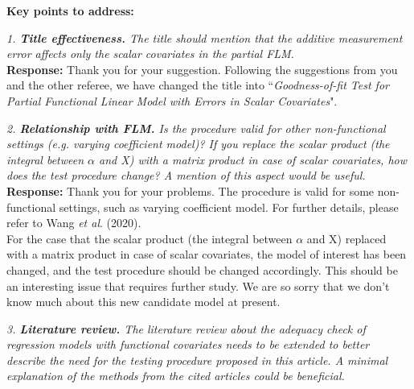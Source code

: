 \documentclass[12pt]{report}
\begin{document}
\vspace*{0.1in}

{\bf Key points to address:}

\vspace*{0.1in}


\begin{description}


\item {{ \textcolor[rgb]{0.00,0.50,1.00}{\em 1. {\bf {Title effectiveness.}} The title should mention that the additive measurement error affects
only the scalar covariates in the partial FLM. }}} \\

{ \bf Response: } Thank you for your suggestion. Following the suggestions from you and the other referee, we have changed the title into ``\emph{Goodness-of-fit Test for Partial Functional Linear Model with Errors in Scalar Covariates}".\\


\item {{ \textcolor[rgb]{0.00,0.50,1.00}{\em 2. {\bf Relationship with FLM.} Is the procedure valid for other non-functional settings (e.g.
varying coefficient model)? If you replace the scalar product (the integral between $\alpha$ and X)
with a matrix product in case of scalar covariates, how does the test procedure change? A
mention of this aspect would be useful. }}}\\

{ \bf Response: } Thank you for your problems. The procedure is valid for some  non-functional settings, such as varying coefficient model.
For further details, please refer to Wang \emph{et al}. (2020).   \\

For the case that the scalar product (the integral between $\alpha$ and X)
replaced with a matrix product in case of scalar covariates, the model of interest  has  been changed, and the test procedure should be changed
accordingly. This should be an interesting issue that requires further study. We are so  sorry that we don't know much about this new candidate model at present.\\

\item {{ \textcolor[rgb]{0.00,0.50,1.00}{\em 3. {\bf Literature review.} The literature review about the adequacy check of regression models
with functional covariates needs to be extended to better describe the need for the testing
procedure proposed in this article. A minimal explanation of the methods from the cited
articles could be beneficial. }}}\\


\end{description}
\end{document}

